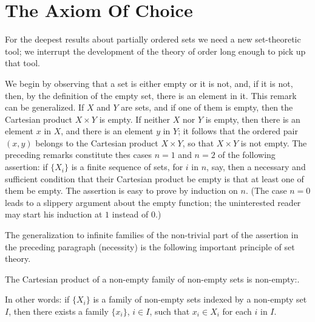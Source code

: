 
\chapter{The Axiom Of Choice} 

For the deepest results about partially ordered sets we need a new set-theoretic tool; we interrupt the development of the theory of order long enough to pick up that tool. 

We begin by observing that a set is either empty or it is not, and, if it is not, then, by the definition of the empty set, there is an element in it. This remark can be generalized. If $X$ and $Y$ are sets, and if one of them is empty, then the Cartesian product $X \times Y$ is empty. If neither $X$ nor $Y$ is empty, then there is an element $x$ in $X$, and there is an element $y$ in $Y$; it follows that the ordered pair $(x, y)$ belongs to the Cartesian product $X \times Y$, so that $X \times Y$ is not empty. The preceding remarks constitute thes cases $n = 1$ and $n = 2$ of the following assertion: if $\{ X_{i} \}$ is a finite sequence of sets, for $i$ in $n$, say, then a necessary and sufficient condition that their Cartesian product be empty is that at least one of them be empty. The assertion is easy to prove by induction on $n$. (The case $n = 0$ leads to a slippery argument about the empty function; the uninterested reader may start his induction at $1$ instead of $0$.) 

The generalization to infinite families of the non-trivial part of the assertion in the preceding paragraph (necessity) is the following important principle of set theory. 

\begin{named} The Cartesian product of a non-empty family of non-empty sets is non-empty:. 
\end{named}

In other words: if $\{ X_{i} \}$ is a family of non-empty sets indexed by a non-empty set $I$, then there exists a family $\{ x_{i} \}$, $i \in I$, such that $x_{i} \in X_{i}$ for each $i$ in $I$. 

